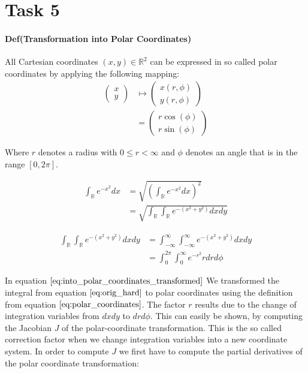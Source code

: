 \documentclass{paper}
\begin{document}
\section*{Task 5}

\paragraph{Def(Transformation into Polar Coordinates)} All Cartesian coordinates $(x,y) \in \mathbb{R}^2$ can be expressed in so called polar coordinates by applying the following mapping:
\begin{align}
\begin{pmatrix}x\\y\end{pmatrix} 
    &\mapsto \begin{pmatrix}x(r,\phi)\\y(r, \phi)\end{pmatrix} \\
    &= \begin{pmatrix}r \cos(\phi)\\r \sin(\phi)\end{pmatrix}
\label{eq:polar_coordinates}
\end{align}

Where $r$ denotes a radius with $0 \leq r < \infty$ and $\phi$ denotes an angle that is in the range $[0,2\pi]$.


\begin{align}
    \int_{\mathbb{R}} e^{-x^2} dx 
    &= \sqrt{\left(\int_{\mathbb{R}} e^{-x^2} dx\right)^2} \\
    &= \sqrt{\int_{\mathbb{R}} \int_{\mathbb{R}} e^{-(x^2 + y^2)} dx dy}
\label{eq:orig_hard}
\end{align}

\begin{align}
    \int_{\mathbb{R}} \int_{\mathbb{R}} e^{-(x^2 + y^2)} dx dy 
    & = \int_{-\infty}^{\infty} \int_{-\infty}^{\infty} e^{-(x^2 + y^2)} dx dy \\
    &= \int_{0}^{2 \pi} \int_{0}^{\infty} e^{-r^2} r dr d\phi
\label{eq:into_polar_coordinates_transformed}
\end{align}

In equation $\ref{eq:into_polar_coordinates_transformed}$ We transformed the integral from equation $\ref{eq:orig_hard}$ to polar coordinates using the definition from equation $\ref{eq:polar_coordinates}$. The factor $r$ results due to the change of integration variables from $dx dy$ to $dr d\phi$. This can easily be shown, by computing the Jacobian $J$ of the polar-coordinate transformation. This is the so called correction factor when we change integration variables into a new coordinate system. In order to compute $J$ we first have to compute the partial derivatives of the polar coordinate transformation:
\end{document}
